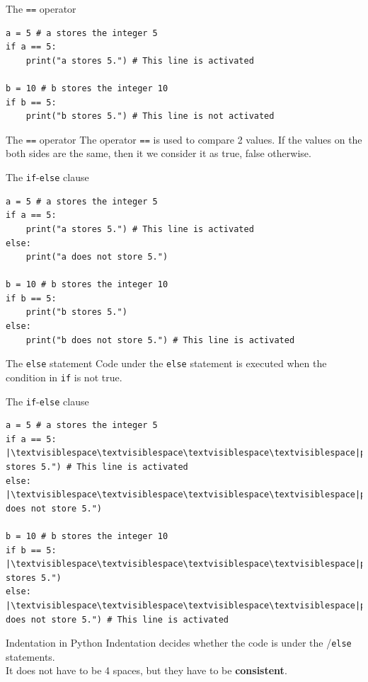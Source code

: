 \documentclass[dvipsnames, svgnames, x11names, handout]{beamer}
\begin{document}
\begin{frame}[fragile]{The \texttt{==} operator}
\begin{verbatim}
a = 5 # a stores the integer 5
if a == 5:
    print("a stores 5.") # This line is activated
    
b = 10 # b stores the integer 10
if b == 5:
    print("b stores 5.") # This line is not activated
\end{verbatim}
\begin{block}{The \texttt{==} operator}
The operator \texttt{==} is used to compare 2 values. If the values on the both sides are the same, then it we consider it as true, false otherwise.
\end{block}
\end{frame}

\begin{frame}[fragile]{The \texttt{if}-\texttt{else} clause}
\begin{verbatim}
a = 5 # a stores the integer 5
if a == 5:
    print("a stores 5.") # This line is activated
else:
    print("a does not store 5.") 
    
b = 10 # b stores the integer 10
if b == 5:
    print("b stores 5.")
else:
    print("b does not store 5.") # This line is activated
\end{verbatim}
\begin{block}{The \texttt{else} statement}
Code under the \texttt{else} statement is executed when the condition in \texttt{if} is not true.
\end{block}
\end{frame}

\begin{frame}[fragile]{The \texttt{if}-\texttt{else} clause}
\begin{verbatim}
a = 5 # a stores the integer 5
if a == 5:
|\textvisiblespace\textvisiblespace\textvisiblespace\textvisiblespace|print("a stores 5.") # This line is activated
else:
|\textvisiblespace\textvisiblespace\textvisiblespace\textvisiblespace|print("a does not store 5.") 
    
b = 10 # b stores the integer 10
if b == 5:
|\textvisiblespace\textvisiblespace\textvisiblespace\textvisiblespace|print("b stores 5.")
else:
|\textvisiblespace\textvisiblespace\textvisiblespace\textvisiblespace|print("b does not store 5.") # This line is activated
\end{verbatim}
\begin{block}{Indentation in Python}
Indentation decides whether the code is under the /\texttt{else} statements.\\
It does not have to be 4 spaces, but they have to be \textbf{consistent}.
\end{block}
\end{frame}
\end{document}
